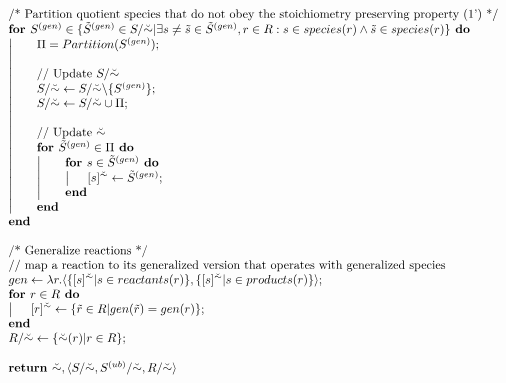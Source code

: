 \documentclass[9pt]{article}
\begin{document}
\[\begin{array}{l}
\mbox{/* Partition quotient species that do not obey the stoichiometry preserving property~(1') */}\\
\mbox{\textbf{for }$S^{(gen)} \in \{\tilde{S}^{(gen)}\in S/\breve{\sim}| \exists s \neq \tilde{s} \in \tilde{S}^{(gen)}, r \in R:  s \in species(r) \land \tilde{s} \in species(r)\}$\textbf{ do}}\\
\left| \indent \begin{array}{l}
\mbox{$\Pi = Partition(S^{(gen)});$}\\
\mbox{} \\
\mbox{// Update $S/\breve{\sim}$} \\
\mbox{$S/\breve{\sim} \leftarrow S/\breve{\sim}\backslash\{S^{(gen)}\};$} \\
\mbox{$S/\breve{\sim} \leftarrow S/\breve{\sim}\cup\Pi;$} \\
\mbox{} \\
\mbox{// Update $\breve{\sim}$} \\
\mbox{\textbf{for }$\tilde{S}^{(gen)} \in \Pi$\textbf{ do}} \\
\left| \indent \begin{array}{l}
\mbox{\textbf{for }$s \in \tilde{S}^{(gen)}$\textbf{ do}}\\
\left| \indent\mbox{$[s]^{\breve{\sim}} \leftarrow \tilde{S}^{(gen)};$}\right. \\
\mbox{\textbf{end}}
\end{array}\right. \\
\mbox{\textbf{end}}
\end{array}\right. \\
\mbox{\textbf{end}}\\
\mbox{~}\\
\mbox{/* Generalize reactions */}\\

\mbox{// map a reaction to its generalized version that operates with generalized species}\\
\mbox{$gen \leftarrow \lambda{r}.\langle\{[s]^{\breve{\sim}} | s \in reactants(r)\}, \{[s]^{\breve{\sim}} | s \in products(r)\}\rangle;$}\\

\mbox{\textbf{for }$r \in R$\textbf{ do}}\\
\left| \indent \mbox{$[r]^{\breve{\sim}} \leftarrow \{\tilde{r} \in R|gen(\tilde{r})=gen(r)\};$}\right. \\
\mbox{\textbf{end}}\\
\mbox{$R/{\breve{\sim}} \leftarrow \{\breve{\sim}(r)|r \in R\};$}\\
\mbox{~}\\
\mbox{\textbf{return }$\breve{\sim}, \langle S/\breve{\sim}, S^{(ub)}/\breve{\sim}, R/\breve{\sim} \rangle$}
\end{array} \]
\end{document}
